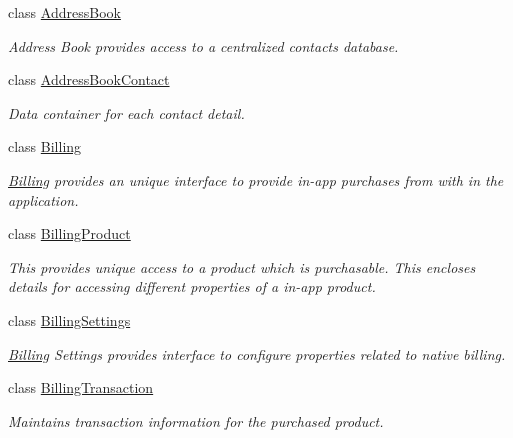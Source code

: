 \begin{DoxyCompactItemize}
\item 
class \hyperlink{class_voxel_busters_1_1_native_plugins_1_1_address_book}{Address\+Book}
\begin{DoxyCompactList}\small\item\em Address Book provides access to a centralized contacts database. \end{DoxyCompactList}\item 
class \hyperlink{class_voxel_busters_1_1_native_plugins_1_1_address_book_contact}{Address\+Book\+Contact}
\begin{DoxyCompactList}\small\item\em Data container for each contact detail. \end{DoxyCompactList}\item 
class \hyperlink{class_voxel_busters_1_1_native_plugins_1_1_billing}{Billing}
\begin{DoxyCompactList}\small\item\em \hyperlink{class_voxel_busters_1_1_native_plugins_1_1_billing}{Billing} provides an unique interface to provide in-\/app purchases from with in the application. \end{DoxyCompactList}\item 
class \hyperlink{class_voxel_busters_1_1_native_plugins_1_1_billing_product}{Billing\+Product}
\begin{DoxyCompactList}\small\item\em This provides unique access to a product which is purchasable. This encloses details for accessing different properties of a in-\/app product. \end{DoxyCompactList}\item 
class \hyperlink{class_voxel_busters_1_1_native_plugins_1_1_billing_settings}{Billing\+Settings}
\begin{DoxyCompactList}\small\item\em \hyperlink{class_voxel_busters_1_1_native_plugins_1_1_billing}{Billing} Settings provides interface to configure properties related to native billing. \end{DoxyCompactList}\item 
class \hyperlink{class_voxel_busters_1_1_native_plugins_1_1_billing_transaction}{Billing\+Transaction}
\begin{DoxyCompactList}\small\item\em Maintains transaction information for the purchased product. \end{DoxyCompactList}\item 

\end{DoxyCompactItemize}
